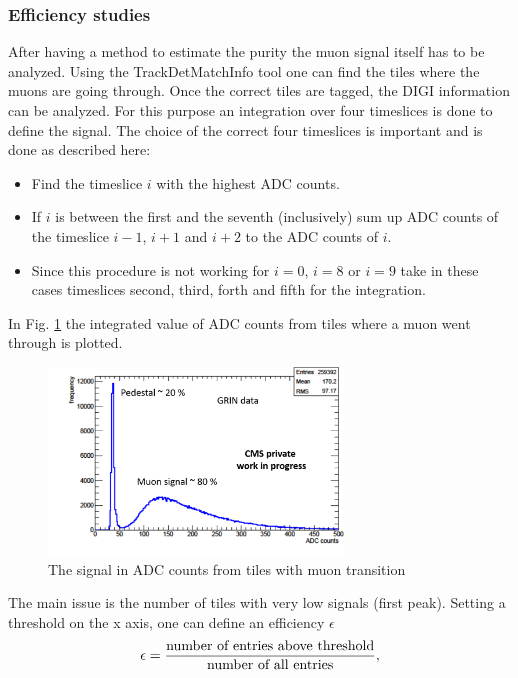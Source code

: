 		\subsubsection{Efficiency studies}
			After having a method to estimate the purity the muon signal itself has to be analyzed.
			Using the TrackDetMatchInfo tool one can find the tiles where the muons are going through.
			Once the correct tiles are tagged, the DIGI information can be analyzed.
			For this purpose an integration over four timeslices is done to define the signal.
			The choice of the correct four timeslices is important and is done as described here:
			\begin{itemize}
			  \item Find the timeslice $i$ with the highest ADC counts.
			  \item If $i$ is between the first and the seventh (inclusively) sum up ADC counts of the timeslice $i-1$, $i+1$ and $i+2$ to the ADC counts of $i$.
			  \item Since this procedure is not working for $i=0$, $i=8$ or $i=9$ take in these cases timeslices second, third, forth and fifth for the integration.
			\end{itemize}
			In Fig. \ref{fig:efficiency1x1} the integrated value of ADC counts from tiles where a muon went through is plotted.
			\begin{figure}[htbp]
				\centering
				\includegraphics[width=0.70\textwidth]{Figures/erdogan/neighborhood1.png}
				\caption{The signal in ADC counts from tiles with muon transition}
				\label{fig:efficiency1x1}
			\end{figure}
			The main issue is the number of tiles with very low signals (first peak).
			Setting a threshold on the x axis, one can define an efficiency $\epsilon$
			\begin{equation}
				\epsilon = \frac{\textnormal{number of entries above threshold}}{\textnormal{number of all entries}},
			\end{equation}
